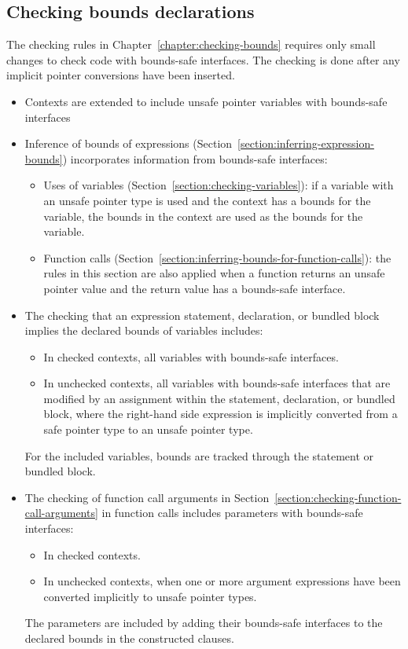 \subsection{Checking bounds declarations}
\label{section:checking-bounds-interfaces}

The checking rules in Chapter~\ref{chapter:checking-bounds} requires
only small changes to check code with bounds-safe interfaces.  The
checking is done after any implicit pointer conversions have been
inserted.
\begin{itemize}
\item Contexts are extended to include unsafe pointer variables with
      bounds-safe interfaces
\item Inference of bounds of expressions (Section~\ref{section:inferring-expression-bounds}) incorporates information from bounds-safe interfaces:
\begin{itemize}
\item Uses of variables (Section~\ref{section:checking-variables}): 
      if a variable with an unsafe pointer type is used and the context has
      a bounds for the variable, the bounds in the context are used as the bounds
      for the variable.
\item Function calls (Section~\ref{section:inferring-bounds-for-function-calls}): 
      the rules in this section are also applied when a function returns an unsafe 
      pointer value and the return value has a bounds-safe interface.
\end{itemize}
\item The checking that an expression statement, declaration, or bundled
      block implies the declared bounds of variables includes:
\begin{itemize}
\item In checked contexts, all variables with bounds-safe interfaces.
\item In unchecked contexts, all variables with bounds-safe interfaces
      that are modified by an assignment within the statement, declaration,
      or bundled block, where the right-hand side expression
      is implicitly converted from a safe pointer type to an unsafe pointer type.
\end{itemize}
For the included variables, bounds are tracked through the statement or
bundled block.
\item The checking of function call arguments in
      Section~\ref{section:checking-function-call-arguments} 
      in function calls includes parameters with bounds-safe interfaces: 
\begin{itemize}
\item In checked contexts.
\item In unchecked contexts, when one or more argument expressions have been 
      converted implicitly to unsafe pointer types.
\end{itemize}
The parameters are included by adding their bounds-safe interfaces to the
declared bounds in the constructed  clauses.
\end{itemize}

